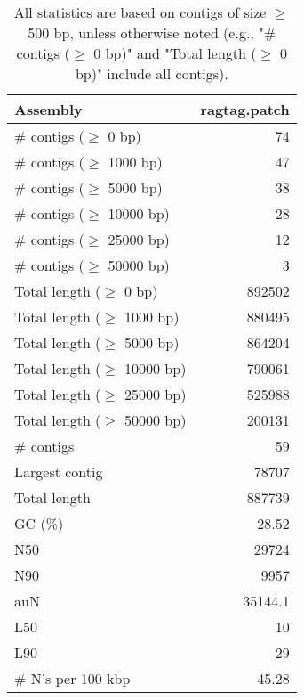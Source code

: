 \documentclass[12pt,a4paper]{article}
\begin{document}
\begin{table}[ht]
\begin{center}
\caption{All statistics are based on contigs of size $\geq$ 500 bp, unless otherwise noted (e.g., "\# contigs ($\geq$ 0 bp)" and "Total length ($\geq$ 0 bp)" include all contigs).}
\begin{tabular}{|l*{1}{|r}|}
\hline
Assembly & ragtag.patch \\ \hline
\# contigs ($\geq$ 0 bp) & 74 \\ \hline
\# contigs ($\geq$ 1000 bp) & 47 \\ \hline
\# contigs ($\geq$ 5000 bp) & 38 \\ \hline
\# contigs ($\geq$ 10000 bp) & 28 \\ \hline
\# contigs ($\geq$ 25000 bp) & 12 \\ \hline
\# contigs ($\geq$ 50000 bp) & 3 \\ \hline
Total length ($\geq$ 0 bp) & 892502 \\ \hline
Total length ($\geq$ 1000 bp) & 880495 \\ \hline
Total length ($\geq$ 5000 bp) & 864204 \\ \hline
Total length ($\geq$ 10000 bp) & 790061 \\ \hline
Total length ($\geq$ 25000 bp) & 525988 \\ \hline
Total length ($\geq$ 50000 bp) & 200131 \\ \hline
\# contigs & 59 \\ \hline
Largest contig & 78707 \\ \hline
Total length & 887739 \\ \hline
GC (\%) & 28.52 \\ \hline
N50 & 29724 \\ \hline
N90 & 9957 \\ \hline
auN & 35144.1 \\ \hline
L50 & 10 \\ \hline
L90 & 29 \\ \hline
\# N's per 100 kbp & 45.28 \\ \hline
\end{tabular}
\end{center}
\end{table}
\end{document}
